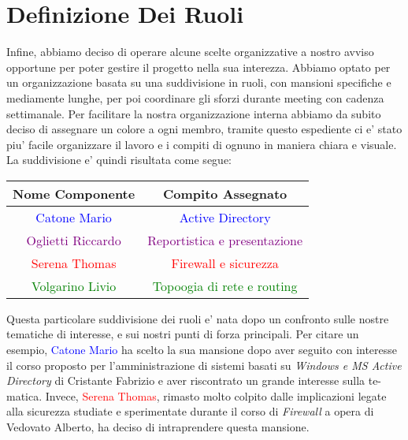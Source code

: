 \documentclass{report}
\begin{document}
		\section{Definizione Dei Ruoli}
			Infine, abbiamo deciso di operare alcune scelte organizzative a nostro avviso opportune per poter gestire il
			progetto nella sua interezza. Abbiamo optato per un organizzazione basata su una suddivisione in ruoli, con
			mansioni specifiche e mediamente lunghe, per poi coordinare gli sforzi durante meeting con cadenza settimanale.
			Per facilitare la nostra organizzazione interna abbiamo da subito deciso di assegnare un colore a ogni membro,
			tramite questo espediente ci e' stato piu' facile organizzare il lavoro e i compiti di ognuno in maniera chiara
			e visuale. 
			La suddivisione e' quindi risultata come segue:
			\begin{center}
				\begin{tabular}{ |c|c| }
					\hline
					Nome Componente & Compito Assegnato \\
					\hline \hline
					\textcolor{Blue}{Catone Mario} & \textcolor{Blue}{Active Directory} \\
					\hline
					\textcolor{Purple}{Oglietti Riccardo} & \textcolor{Purple}{Reportistica e presentazione} \\
					\hline
					\textcolor{Red}{Serena Thomas} & \textcolor{Red}{Firewall e sicurezza} \\
					\hline
					\textcolor{Green}{Volgarino Livio} & \textcolor{Green}{Topoogia di rete e routing} \\
					\hline
				\end{tabular}
			\end{center}
			Questa particolare suddivisione dei ruoli e' nata dopo un confronto sulle nostre tematiche di interesse, e sui
			nostri punti di forza principali. Per citare un esempio, \textcolor{Blue}{Catone Mario} ha scelto la sua mansione
			dopo aver seguito con interesse il corso proposto per l'amministrazione di sistemi basati su \emph{Windows e MS
			Active Directory} di Cristante Fabrizio e aver riscontrato un grande interesse sulla te-\\matica. Invece,
			\textcolor{Red}{Serena Thomas}, rimasto molto colpito dalle implicazioni legate alla sicurezza studiate e
			sperimentate durante il corso di \emph{Firewall} a opera di Vedovato Alberto, ha deciso di intraprendere
			questa mansione.
\end{document}
